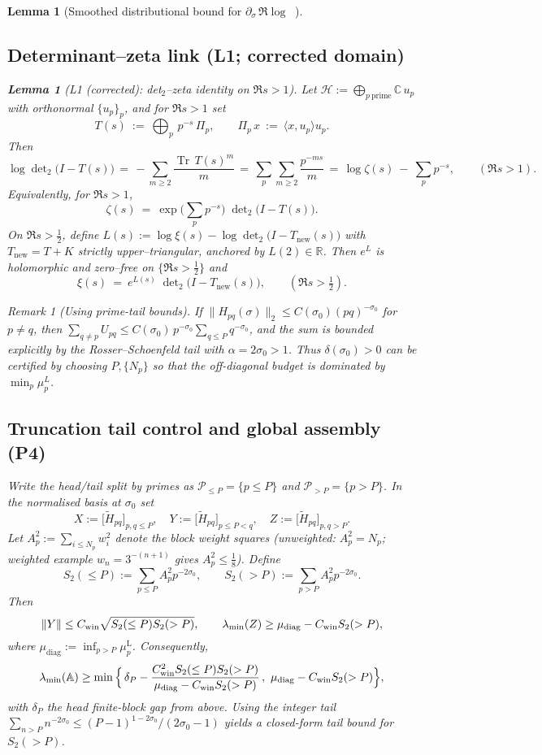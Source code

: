 \documentclass[11pt]{article}
\newtheorem{lemma}[theorem]{Lemma}
\theoremstyle{definition}
\theoremstyle{remark}
\newtheorem{remark}[theorem]{Remark}
\newcommand{\R}{\mathbb{R}}
\DeclareMathOperator{\dettwo}{det_2}
\begin{document}
\begin{lemma}[Smoothed distributional bound for $\partial_\sigma\,\Re\log\dettwo$]
\subsection*{Determinant--zeta link (L1; corrected domain)}
\begin{lemma}[L1 (corrected): det$_2$--zeta identity on $\Re s>1$]\label{lem:L1-det2-zeta}
Let $\mathcal H:=\bigoplus_{p\ \mathrm{prime}} \mathbb C\,u_p$ with orthonormal $\{u_p\}_p$, and for $\Re s>1$ set
\[
  T(s)\ :=\ \bigoplus_{p}\, p^{-s}\,\Pi_p,\qquad \Pi_p\,x\ :=\ \langle x, u_p\rangle u_p.
\]
Then
\[
  \log\det\nolimits_{2}\bigl(I-T(s)\bigr)
  \,=\, -\sum_{m\ge2}\frac{\operatorname{Tr}\,T(s)^{m}}{m}
  \,=\, \sum_{p}\sum_{m\ge2}\frac{p^{-ms}}{m}
  \,=\, \log\zeta(s)\ -\ \sum_{p}p^{-s},\qquad (\Re s>1).
\]
Equivalently, for $\Re s>1$,
\[
  \zeta(s)\ =\ \exp\!\Big(\sum_{p}p^{-s}\Big)\;\det\nolimits_{2}\bigl(I-T(s)\bigr).
\]
On $\Re s>\tfrac12$, define $L(s):=\log\xi(s)-\log\det_{2}\big(I-T_{\mathrm{new}}(s)\big)$ with $T_{\mathrm{new}}=T+K$ strictly upper--triangular, anchored by $L(2)\in\R$. Then $e^{L}$ is holomorphic and zero--free on $\{\Re s>\tfrac12\}$ and
\[
  \xi(s)\ =\ e^{L(s)}\;\det\nolimits_{2}\bigl(I-T_{\mathrm{new}}(s)\bigr),\qquad (\Re s>\tfrac12).
\]
\end{lemma}

\begin{remark}[Using prime-tail bounds]
If $\|H_{pq}(\sigma)\|_2\le C(\sigma_0)(pq)^{-\sigma_0}$ for $p\ne q$, then $\sum_{q\ne p}U_{pq}\le C(\sigma_0)\,p^{-\sigma_0}\sum_{q\le P} q^{-\sigma_0}$, and the sum is bounded explicitly by the Rosser--Schoenfeld tail with $\alpha=2\sigma_0>1$. Thus $\delta(\sigma_0)>0$ can be certified by choosing $P,\{N_p\}$ so that the off-diagonal budget is dominated by $\min_p\mu_p^L$.
\end{remark}

\subsection*{Truncation tail control and global assembly (P4)}
Write the head/tail split by primes as $\mathcal P_{\le P}=\{p\le P\}$ and $\mathcal P_{>P}=\{p>P\}$. In the normalised basis at $\sigma_0$ set
\[
 X:=\bigl[\widetilde H_{pq}\bigr]_{p,q\le P},\quad Y:=\bigl[\widetilde H_{pq}\bigr]_{p\le P<q},\quad Z:=\bigl[\widetilde H_{pq}\bigr]_{p,q>P}.
\]
Let $A_p^2:=\sum_{i\le N_p} w_i^2$ denote the block weight squares (unweighted: $A_p^2=N_p$; weighted example $w_n=3^{-(n+1)}$ gives $A_p^2\le\tfrac18$). Define
\[ S_2(\le P):=\sum_{p\le P} A_p^2 p^{-2\sigma_0},\qquad S_2(>P):=\sum_{p>P} A_p^2 p^{-2\sigma_0}. \]
Then
\[ \|Y\|\le C_{\rm win}\sqrt{S_2(\le P)S_2(>P)},\qquad \lambda_{\min}(Z)\ge \mu_{\mathrm{diag}}-C_{\rm win}S_2(>P), \]
where $\mu_{\mathrm{diag}}:=\inf_{p>P}\mu_p^{\mathrm L}$. Consequently,
\[ \lambda_{\min}(\mathbb A)\ge \min\Big\{\,\delta_P - \dfrac{C_{\rm win}^2 S_2(\le P)S_2(>P)}{\mu_{\mathrm{diag}}-C_{\rm win}S_2(>P)}\,,\ \mu_{\mathrm{diag}}-C_{\rm win}S_2(>P)\Big\}, \]
with $\delta_P$ the head finite-block gap from above. Using the integer tail $\sum_{n>P}n^{-2\sigma_0}\le (P-1)^{1-2\sigma_0}/(2\sigma_0-1)$ yields a closed-form tail bound for $S_2(>P)$.

\end{lemma}
\end{document}
